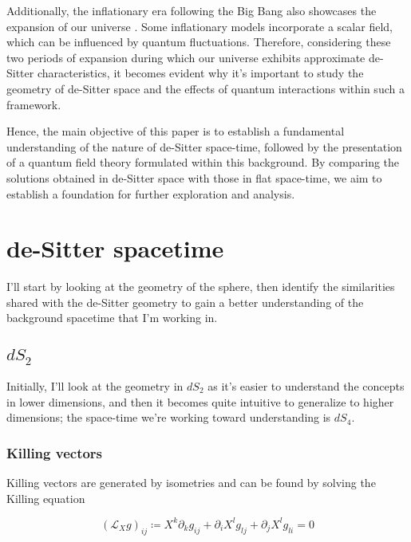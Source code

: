 \documentclass[a4paper,11pt]{article}
\numberwithin{equation}{section}
\numberwithin{figure}{section}
\begin{document}
\begin{large}
Additionally, the inflationary era following the Big Bang also showcases the expansion of our universe \cite{baumann2012tasi,tsujikawa2003introductory}. Some inflationary models incorporate a scalar field, which can be influenced by quantum fluctuations. Therefore, considering these two periods of expansion during which our universe exhibits approximate de-Sitter characteristics, it becomes evident why it's important to study the geometry of de-Sitter space and the effects of quantum interactions within such a framework.

Hence, the main objective of this paper is to establish a fundamental understanding of the nature of de-Sitter space-time, followed by the presentation of a quantum field theory formulated within this background. By comparing the solutions obtained in de-Sitter space with those in flat space-time, we aim to establish a foundation for further exploration and analysis.


\newpage 


\section{\Large de-Sitter spacetime}


I'll start by looking at the geometry of the sphere, then identify the similarities shared with the de-Sitter geometry to gain a better understanding of the background spacetime \cite{kim2002classical} that I'm working in. 

\vspace{0.5cm}

\subsection{$dS_2$}


Initially, I'll look at the geometry in $dS_2$ as it's easier to understand the concepts in lower dimensions, and then it becomes quite intuitive to generalize to higher dimensions; the space-time we're working toward understanding is $dS_4$.


\subsubsection{Killing vectors}


Killing vectors are generated by isometries and can be found by solving the Killing equation \cite{yan2017killing}


$$(\mathcal{L}_Xg)_{ij} \coloneqq X^k \partial _k g_{ij} + \partial _i X^l g_{lj} + \partial _j X^l g_{li}  = 0 $$



\end{large}
\end{document}
